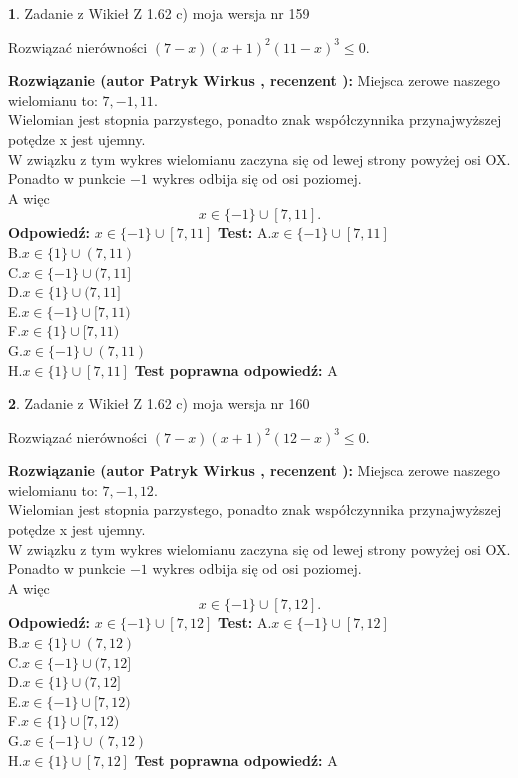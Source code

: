 \documentclass[12pt, a4paper]{article}
\theoremstyle{definition} %
\newtheorem{zad}{}
\newcommand{\zadStart}[1]{\begin{zad}#1\newline}
\newcommand{\zadStop}{\end{zad}}
\newcommand{\rozwStart}[2]{\noindent \textbf{Rozwiązanie (autor #1 , recenzent #2): }\newline}
\newcommand{\rozwStop}{\newline}
\newcommand{\odpStart}{\noindent \textbf{Odpowiedź:}\newline}
\newcommand{\odpStop}{\newline}
\newcommand{\testStart}{\noindent \textbf{Test:}\newline}
\newcommand{\testStop}{\newline}
\newcommand{\kluczStart}{\noindent \textbf{Test poprawna odpowiedź:}\newline}
\newcommand{\kluczStop}{\newline}
\begin{document}
\zadStart{Zadanie z Wikieł Z 1.62 c) moja wersja nr 159}

Rozwiązać nierówności $(7-x)(x+1)^{2}(11-x)^{3}\le0$.
\zadStop
\rozwStart{Patryk Wirkus}{}
Miejsca zerowe naszego wielomianu to: $7, -1, 11$.\\
Wielomian jest stopnia parzystego, ponadto znak współczynnika przy\linebreak najwyższej potędze x jest ujemny.\\ W związku z tym wykres wielomianu zaczyna się od lewej strony powyżej osi OX.\\
Ponadto w punkcie $-1$ wykres odbija się od osi poziomej.\\
A więc $$x \in \{-1\} \cup [7,11].$$
\rozwStop
\odpStart
$x \in \{-1\} \cup [7,11]$
\odpStop
\testStart
A.$x \in \{-1\} \cup [7,11]$\\
B.$x \in \{1\} \cup (7,11)$\\
C.$x \in \{-1\} \cup (7,11]$\\
D.$x \in \{1\} \cup (7,11]$\\
E.$x \in \{-1\} \cup [7,11)$\\
F.$x \in \{1\} \cup [7,11)$\\
G.$x \in \{-1\} \cup (7,11)$\\
H.$x \in \{1\} \cup [7,11]$
\testStop
\kluczStart
A
\kluczStop



\zadStart{Zadanie z Wikieł Z 1.62 c) moja wersja nr 160}

Rozwiązać nierówności $(7-x)(x+1)^{2}(12-x)^{3}\le0$.
\zadStop
\rozwStart{Patryk Wirkus}{}
Miejsca zerowe naszego wielomianu to: $7, -1, 12$.\\
Wielomian jest stopnia parzystego, ponadto znak współczynnika przy\linebreak najwyższej potędze x jest ujemny.\\ W związku z tym wykres wielomianu zaczyna się od lewej strony powyżej osi OX.\\
Ponadto w punkcie $-1$ wykres odbija się od osi poziomej.\\
A więc $$x \in \{-1\} \cup [7,12].$$
\rozwStop
\odpStart
$x \in \{-1\} \cup [7,12]$
\odpStop
\testStart
A.$x \in \{-1\} \cup [7,12]$\\
B.$x \in \{1\} \cup (7,12)$\\
C.$x \in \{-1\} \cup (7,12]$\\
D.$x \in \{1\} \cup (7,12]$\\
E.$x \in \{-1\} \cup [7,12)$\\
F.$x \in \{1\} \cup [7,12)$\\
G.$x \in \{-1\} \cup (7,12)$\\
H.$x \in \{1\} \cup [7,12]$
\testStop
\kluczStart
A
\kluczStop
\end{document}
